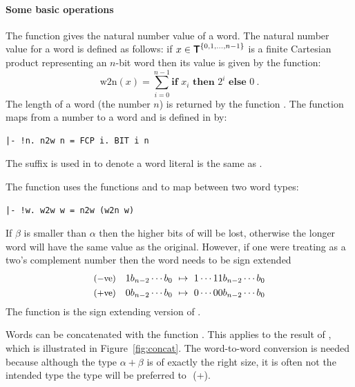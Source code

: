 {\paragraph{Some basic operations}

The function  gives the natural number value of a 
word.  The natural number value for a word is defined as follows: if 
$x\in\mbox{${\sf T}\!\!\!\!{\sf T}$}^{\{0, 1, \ldots, n - 1\}}$ is a finite Cartesian product 
representing an $n$-bit word then its value is given by the function:
\[ \mathrm{w2n}(x) = \sum_{i = 0}^{n - 1} \textbf{if } x_i \textbf{ then } 2^i 
\textbf{ else } 0\ .\]
The length of a word (the number $n$) is returned by the function 
.
The function  maps from a number to a word and is 
defined in \HOL{} by:
\begin{hol}
\begin{verbatim}
|- !n. n2w n = FCP i. BIT i n
\end{verbatim}
\end{hol}
The suffix  is used in \HOL{} to denote a word literal \eg{} 
 is the same as .

The function  uses the functions  and 
 to map between two word types:
\begin{hol}
\begin{verbatim}
|- !w. w2w w = n2w (w2n w)
\end{verbatim}
\end{hol}
If $\beta$ is smaller than $\alpha$ then the higher bits of  will be 
lost, otherwise the longer word will have the same value as the original.  
However, if one were treating  as a two's complement number then the 
word needs to be sign extended \ie{}
\begin{eqnarray*}
\mbox{\small ($-$ve)}\quad 1b_{n-2} \cdots b_0\ \mapsto \ 1 \cdots 1 1 b_{n-2} 
\cdots b_0 \\
\mbox{\small ($+$ve)}\quad 0b_{n-2} \cdots b_0\ \mapsto \ 0 \cdots 0 0 b_{n-2} 
\cdots b_0
\end{eqnarray*}
The function  is the sign extending version of 
.

Words can be concatenated with the function 
.  This applies  
to the result of 
, which is 
illustrated in Figure~\ref{fig:concat}.  The word-to-word conversion is needed 
because although the type $\alpha+\beta$ is of exactly the right size, it is 
often not the intended type \eg{} the type  will be preferred to 
\mbox{\,\holtxt{**}\,(+)}.

}

